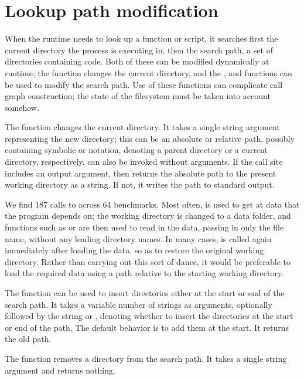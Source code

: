 \section{Lookup path modification}

When the \matlab runtime needs to look up a function or script, it searches
first the current directory the process is executing in, then the \matlab search
path, a set of directories containing \matlab code. Both of these can be
modified dynamically at runtime; the  function changes the current
directory, and the ,  and  functions can
be used to modify the search path. Use of these functions can complicate call
graph construction; the state of the filesystem must be taken into account
somehow.

The  function changes the current directory. It takes a single string
argument representing the new directory; this can be an absolute or relative
path, possibly containing symbolic  or  notation, denoting a
parent directory or a current directory, respectively.  can also be
invoked without arguments. If the call site includes an output argument, then
 returns the absolute path to the present working directory as a
string. If not, it writes the path to standard output.

We find 187 calls to  across 64 benchmarks. Most often,  is
used to get at data that the program depends on; the working directory is
changed to a data folder, and functions such as  or 
are then used to read in the data, passing in only the file name, without any
leading directory names. In many cases,  is called again immediately
after loading the data, so as to restore the original working directory. Rather
than carrying out this sort of dance, it would be preferable to load the
required data using a path relative to the starting working directory.

The  function can be used to insert directories either at the
start or end of the \matlab search path. It takes a variable number of strings
as arguments, optionally followed by the string  or
, denoting whether to insert the directories at the start or end
of the path. The default behavior is to add them at the start. It returns the
old path.

The  function removes a directory from the search path. It takes a
single string argument and returns nothing.

